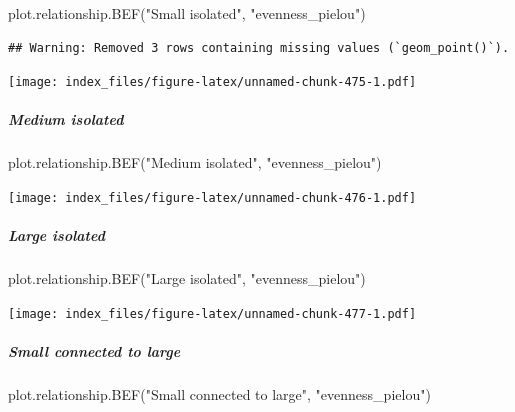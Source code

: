 \documentclass[
]{article}
\newenvironment{Shaded}{\begin{snugshade}}{\end{snugshade}}
\newcommand{\FunctionTok}[1]{\textcolor[rgb]{0.00,0.00,0.00}{#1}}
\newcommand{\NormalTok}[1]{#1}
\newcommand{\StringTok}[1]{\textcolor[rgb]{0.31,0.60,0.02}{#1}}
\begin{document}
\begin{Shaded}
\begin{Highlighting}[]
\FunctionTok{plot.relationship.BEF}\NormalTok{(}\StringTok{"Small isolated"}\NormalTok{,}
                      \StringTok{"evenness\_pielou"}\NormalTok{)}
\end{Highlighting}
\end{Shaded}

\begin{verbatim}
## Warning: Removed 3 rows containing missing values (`geom_point()`).
\end{verbatim}

\texttt{[image: index\_files/figure-latex/unnamed-chunk-475-1.pdf]}

\hypertarget{medium-isolated-2}{%
\subparagraph{Medium isolated}\label{medium-isolated-2}}

\begin{Shaded}
\begin{Highlighting}[]
\FunctionTok{plot.relationship.BEF}\NormalTok{(}\StringTok{"Medium isolated"}\NormalTok{,}
                      \StringTok{"evenness\_pielou"}\NormalTok{)}
\end{Highlighting}
\end{Shaded}

\texttt{[image: index\_files/figure-latex/unnamed-chunk-476-1.pdf]}

\hypertarget{large-isolated-2}{%
\subparagraph{Large isolated}\label{large-isolated-2}}

\begin{Shaded}
\begin{Highlighting}[]
\FunctionTok{plot.relationship.BEF}\NormalTok{(}\StringTok{"Large isolated"}\NormalTok{,}
                      \StringTok{"evenness\_pielou"}\NormalTok{)}
\end{Highlighting}
\end{Shaded}

\texttt{[image: index\_files/figure-latex/unnamed-chunk-477-1.pdf]}

\hypertarget{small-connected-to-large-2}{%
\subparagraph{Small connected to
large}\label{small-connected-to-large-2}}

\begin{Shaded}
\begin{Highlighting}[]
\FunctionTok{plot.relationship.BEF}\NormalTok{(}\StringTok{"Small connected to large"}\NormalTok{,}
                      \StringTok{"evenness\_pielou"}\NormalTok{)}
\end{Highlighting}
\end{Shaded}
\end{document}
